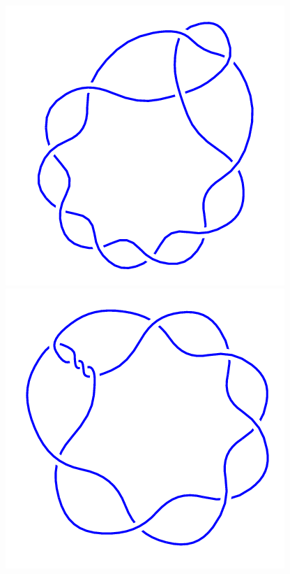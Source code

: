 \begin{figure}[H]
    \begin{minipage}[b]{.18\linewidth}
        \centering
        \includegraphics[width=\linewidth]{../data/10_2.png}
    \end{minipage}
    \begin{minipage}[b]{.18\linewidth}
        \centering
        \includegraphics[width=\linewidth]{../data/10_3.png}

\end{minipage}
\end{figure}
